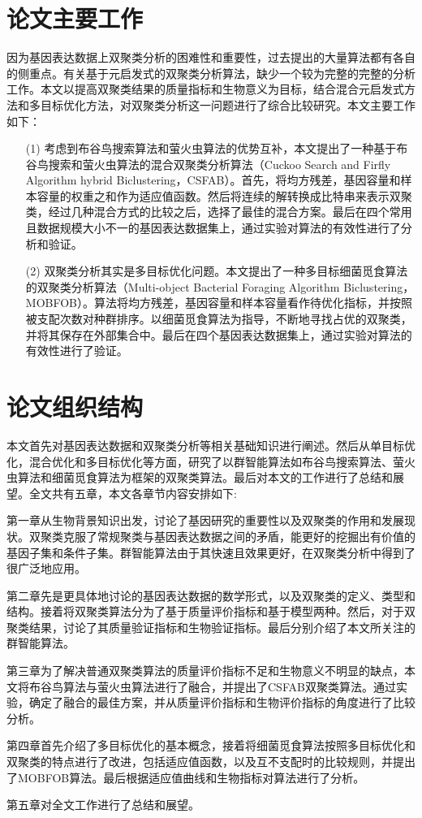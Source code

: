 \section{论文主要工作}
    因为基因表达数据上双聚类分析的困难性和重要性，过去提出的大量算法都有各自的侧重点。有关基于元启发式的双聚类分析算法，缺少一个较为完整的完整的分析工作。本文以提高双聚类结果的质量指标和生物意义为目标，结合混合元启发式方法和多目标优化方法，对双聚类分析这一问题进行了综合比较研究。本文主要工作如下：
    \begin{itemize}
       \item[(1)] {考虑到布谷鸟搜索算法和萤火虫算法的优势互补，本文提出了一种基于布谷鸟搜索和萤火虫算法的混合双聚类分析算法（Cuckoo Search and Firfly Algorithm hybrid Biclustering，CSFAB）。首先，将均方残差，基因容量和样本容量的权重之和作为适应值函数。然后将连续的解转换成比特串来表示双聚类，经过几种混合方式的比较之后，选择了最佳的混合方案。最后在四个常用且数据规模大小不一的基因表达数据集上，通过实验对算法的有效性进行了分析和验证。}

       \item[(2)] {双聚类分析其实是多目标优化问题。本文提出了一种多目标细菌觅食算法的双聚类分析算法（Multi-object Bacterial Foraging Algorithm Biclustering，MOBFOB）。算法将均方残差，基因容量和样本容量看作待优化指标，并按照被支配次数对种群排序。以细菌觅食算法为指导，不断地寻找占优的双聚类，并将其保存在外部集合中。最后在四个基因表达数据集上，通过实验对算法的有效性进行了验证。}
       
    \end{itemize}

\section{论文组织结构}
    本文首先对基因表达数据和双聚类分析等相关基础知识进行阐述。然后从单目标优化，混合优化和多目标优化等方面，研究了以群智能算法如布谷鸟搜索算法、萤火虫算法和细菌觅食算法为框架的双聚类算法。最后对本文的工作进行了总结和展望。全文共有五章，本文各章节内容安排如下:

    第一章从生物背景知识出发，讨论了基因研究的重要性以及双聚类的作用和发展现状。双聚类克服了常规聚类与基因表达数据之间的矛盾，能更好的挖掘出有价值的基因子集和条件子集。群智能算法由于其快速且效果更好，在双聚类分析中得到了很广泛地应用。

    第二章先是更具体地讨论的基因表达数据的数学形式，以及双聚类的定义、类型和结构。接着将双聚类算法分为了基于质量评价指标和基于模型两种。然后，对于双聚类结果，讨论了其质量验证指标和生物验证指标。最后分别介绍了本文所关注的群智能算法。

    第三章为了解决普通双聚类算法的质量评价指标不足和生物意义不明显的缺点，本文将布谷鸟算法与萤火虫算法进行了融合，并提出了CSFAB双聚类算法。通过实验，确定了融合的最佳方案，并从质量评价指标和生物评价指标的角度进行了比较分析。

    第四章首先介绍了多目标优化的基本概念，接着将细菌觅食算法按照多目标优化和双聚类的特点进行了改进，包括适应值函数，以及互不支配时的比较规则，并提出了MOBFOB算法。最后根据适应值曲线和生物指标对算法进行了分析。
    
    第五章对全文工作进行了总结和展望。
